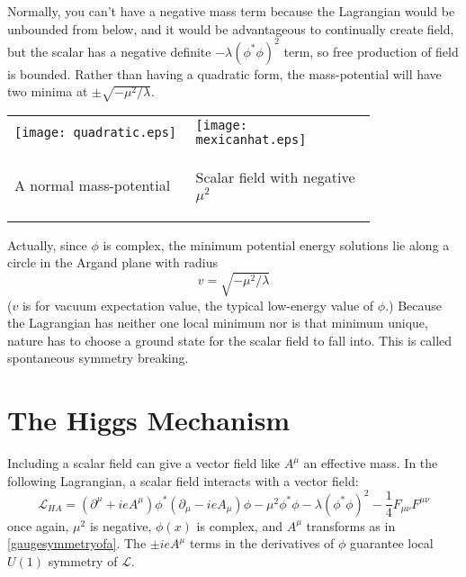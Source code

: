 \documentclass[12pt]{article}
\begin{document}
Normally, you can't have a negative mass term because the Lagrangian
would be unbounded from below, and it would be advantageous to
continually create field, but the scalar has a negative definite
$-\lambda (\phi^* \phi)^2$ term, so free production of field is
bounded.  Rather than having a quadratic form, the mass-potential will
have two minima at $\pm\sqrt{-\mu^2/\lambda}$.
\begin{center}
  \begin{tabular}{p{0.4\linewidth} p{0.4\linewidth}}
    \texttt{[image: quadratic.eps]} &
    \texttt{[image: mexicanhat.eps]} \\
    \vspace{-0.5 cm} \begin{center} A normal mass-potential\end{center} &
    \vspace{-0.5 cm} \begin{center}Scalar field with negative $\mu^2$\end{center}
  \end{tabular}
\end{center}
Actually, since $\phi$ is complex, the minimum potential energy
solutions lie along a circle in the Argand plane with radius
\begin{equation}
  v = \sqrt{-\mu^2/\lambda}
\end{equation}
($v$ is for vacuum expectation value, the
typical low-energy value of $\phi$.)  Because the Lagrangian has
neither one local minimum nor is that minimum unique, nature has to
choose a ground state for the scalar field to fall into.  This is
called spontaneous symmetry breaking.

\section{The Higgs Mechanism}

Including a scalar field can give a vector field like $A^\mu$ an
effective mass.  In the following Lagrangian, a scalar field interacts
with a vector field:
\begin{equation}
  \mathcal{L}_{HA} = (\partial^\mu + ieA^\mu) \phi^* (\partial_\mu - ieA_\mu) \phi
  - \mu^2 \phi^*\phi - \lambda (\phi^*\phi)^2 - \frac{1}{4} F_{\mu\nu}F^{\mu\nu}
\end{equation}
once again, $\mu^2$ is negative, $\phi(x)$ is complex, and $A^\mu$
transforms as in \ref{gaugesymmetryofa}.  The $\pm ie A^\mu$ terms in
the derivatives of $\phi$ guarantee local $U(1)$ symmetry of
$\mathcal{L}$.
\end{document}
